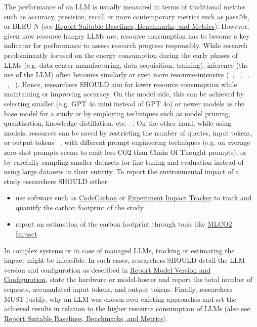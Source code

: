 The performance of an LLM is usually measured in terms of traditional metrics such as accuracy, precision, recall or more contemporary metrics such as pass@k, or BLEU-N (see \href{/guidelines/report-baselines-benchmarks-and-metrics}{Report Suitable Baselines, Benchmarks, and Metrics}). However, given how resource hungry LLMs are, resource consumption has to become a key indicator for performance to assess research progress responsibly. 
While research predominantly focused on the energy consumption during the early phases of LLMs (e.g. data center manufacturing, data acquisition, training), inference (the use of the LLM) often becomes similarly or even more resource-intensive (~\cite{de2023growing}, ~\cite{DBLP:conf/mlsys/WuRGAAMCBHBGGOM22}, ~\cite{DBLP:journals/corr/abs-2410-02950}, ~\cite{JIANG2024202}, ~\cite{mitu2024hidden}).
Hence, researchers SHOULD aim for lower resource consumption while maintaining or improving accuracy. On the model side, this can be achieved by selecting smaller (e.g. GPT 4o mini instead of GPT 4o) or newer models as the base model for a study or by employing techniques such as model pruning, quantization, knowledge distillation, etc. ~\cite{mitu2024hidden}. On the other hand, while using models, resources can be saved by restricting the number of queries, input tokens, or output tokens ~\cite{mitu2024hidden}, with different prompt engineering techniques (e.g. on average zero-shot prompts seems to emit less CO2 than Chain Of Thought prompts), or by carefully sampling smaller datasets for fine-tuning and evaluation instead of using large datasets in their entirity.
To report the environmental impact of a study researchers SHOULD either
\begin{itemize}
    \item use software such as \href{https://github.com/mlco2/codecarbon}{CodeCarbon} or \href{experiment-impact-tracker}{Experiment Impact Tracker} to track and quanitfy the carbon footprint of the study
    \item report an estimation of the carbon footprint through tools like \href{https://mlco2.github.io/impact/#about}{MLCO2 Impact}
\end{itemize}
In complex systems or in case of managed LLMs, tracking or estimating the impact might be infeasible. In such cases, researchers SHOULD detail the LLM version and configuration as described in \href{/guidelines/report-version-and-configuration}{Report Model Version and Configuration}, state the hardware or model-hoster and report the total number of requests, accumulated input tokens, and output tokens.
Finally, researchers MUST justify, why an LLM was chosen over existing approaches and set the achieved results in relation to the higher resource consumption of LLMs (also see \href{/guidelines/report-baselines-benchmarks-and-metrics}{Report Suitable Baselines, Benchmarks, and Metrics}).

